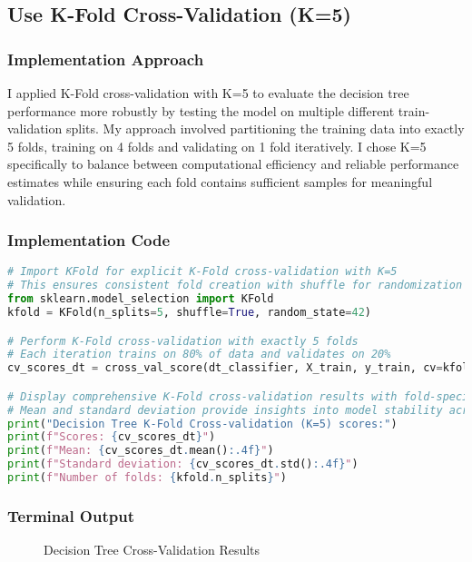 \documentclass[12pt,a4paper]{article}
\begin{document}
\subsection{Use K-Fold Cross-Validation (K=5)}

\subsubsection{Implementation Approach}
I applied K-Fold cross-validation with K=5 to evaluate the decision tree performance more robustly by testing the model on multiple different train-validation splits. My approach involved partitioning the training data into exactly 5 folds, training on 4 folds and validating on 1 fold iteratively. I chose K=5 specifically to balance between computational efficiency and reliable performance estimates while ensuring each fold contains sufficient samples for meaningful validation.

\subsubsection{Implementation Code}
\begin{lstlisting}[language=Python, caption=K-Fold Cross-Validation for Decision Tree (K=5)]
# Import KFold for explicit K-Fold cross-validation with K=5
# This ensures consistent fold creation with shuffle for randomization
from sklearn.model_selection import KFold
kfold = KFold(n_splits=5, shuffle=True, random_state=42)

# Perform K-Fold cross-validation with exactly 5 folds
# Each iteration trains on 80% of data and validates on 20%
cv_scores_dt = cross_val_score(dt_classifier, X_train, y_train, cv=kfold)

# Display comprehensive K-Fold cross-validation results with fold-specific scores
# Mean and standard deviation provide insights into model stability across folds
print("Decision Tree K-Fold Cross-validation (K=5) scores:")
print(f"Scores: {cv_scores_dt}")
print(f"Mean: {cv_scores_dt.mean():.4f}")
print(f"Standard deviation: {cv_scores_dt.std():.4f}")
print(f"Number of folds: {kfold.n_splits}")
\end{lstlisting}

\subsubsection{Terminal Output}

\begin{figure}[h!]
\centering
    \caption{Decision Tree Cross-Validation Results}
\end{figure}
\end{document}
